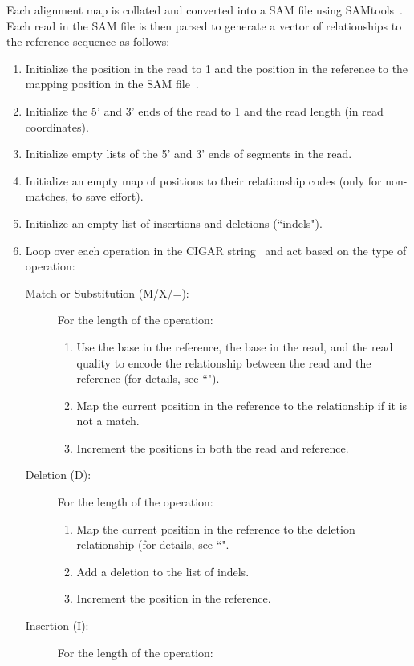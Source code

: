 \documentclass{article}
\begin{document}
Each alignment map is collated and converted into a SAM file using SAMtools~\cite{Danecek2021}.
Each read in the SAM file is then parsed to generate a vector of relationships to the reference sequence as follows:
\begin{enumerate}
    \item Initialize the position in the read to 1 and the position in the reference to the mapping position in the SAM file~\cite{Li2009}.
    \item Initialize the 5' and 3' ends of the read to 1 and the read length (in read coordinates).
    \item Initialize empty lists of the 5' and 3' ends of segments in the read.
    \item Initialize an empty map of positions to their relationship codes (only for non-matches, to save effort).
    \item Initialize an empty list of insertions and deletions (``indels").
    \item Loop over each operation in the CIGAR string~\cite{Li2009} and act based on the type of operation:
    \begin{description}
        \item[Match or Substitution (M/X/=):] For the length of the operation:
        \begin{enumerate}
            \item Use the base in the reference, the base in the read, and the read quality to encode the relationship between the read and the reference (for details, see ``").
            \item Map the current position in the reference to the relationship if it is not a match.
            \item Increment the positions in both the read and reference.
        \end{enumerate}
        \item[Deletion (D):] For the length of the operation:
        \begin{enumerate}
            \item Map the current position in the reference to the deletion relationship (for details, see ``".
            \item Add a deletion to the list of indels.
            \item Increment the position in the reference.
        \end{enumerate}
        \item[Insertion (I):] For the length of the operation:

\end{description}
\end{enumerate}
\end{document}
